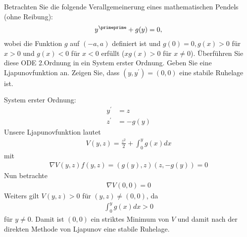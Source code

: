 \begin{exercise}
Betrachten Sie die folgende Verallgemeinerung eines mathematischen Pendels (ohne Reibung):
\begin{align*}
  y^{\primeprime} + g(y) = 0,
\end{align*}
wobei die Funktion $g$ auf $(-a,a)$ definiert ist und $g(0) = 0, g(x) > 0$ für $x > 0$
und $g(x) < 0$ für $x < 0$ erfüllt ($xg(x) > 0$ für $x \neq 0$). Überführen Sie
diese ODE 2.Ordnung in ein System erster Ordnung. Geben Sie eine Ljapunovfunktion
an. Zeigen Sie, dass $(y,y^{\prime}) = (0,0)$ eine stabile Ruhelage ist.
\end{exercise}
\begin{solution}
System erster Ordnung:
\begin{align*}
  y^{\prime} &=  z\\
  z^{\prime} &= -g(y)
\end{align*}
Unsere Ljapunovfunktion lautet
\begin{align*}
  V(y,z) = \frac{z^2}{2} + \int_0^y g(x) dx
\end{align*}
mit
\begin{align*}
  \nabla V(y,z)f(y,z) = (g(y),z)(z,-g(y)) = 0
\end{align*}
Nun betrachte
\begin{align*}
  \nabla V(0,0) = 0
\end{align*}
Weiters gilt $V(y,z) > 0$ für $(y,z) \neq (0,0)$, da
\begin{align*}
  \int_0^y g(x) dx > 0
\end{align*}
für $y \neq 0$.
Damit ist $(0,0)$ ein striktes Minimum von $V$ und damit nach der direkten Methode
von Ljapunov eine stabile Ruhelage.
\end{solution}
